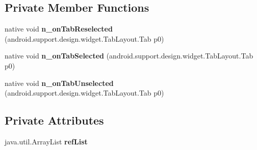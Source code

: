 \subsection*{Private Member Functions}
\begin{DoxyCompactItemize}
\item 
\mbox{\label{classmono_1_1android_1_1support_1_1design_1_1widget_1_1TabLayout__OnTabSelectedListenerImplementor_ac18eb505a0d94b91fdf29e1854630ce3}} 
native void {\bfseries n\+\_\+on\+Tab\+Reselected} (android.\+support.\+design.\+widget.\+Tab\+Layout.\+Tab p0)
\item 
\mbox{\label{classmono_1_1android_1_1support_1_1design_1_1widget_1_1TabLayout__OnTabSelectedListenerImplementor_ab714061ffdc62192ab6c46f25ef81e04}} 
native void {\bfseries n\+\_\+on\+Tab\+Selected} (android.\+support.\+design.\+widget.\+Tab\+Layout.\+Tab p0)
\item 
\mbox{\label{classmono_1_1android_1_1support_1_1design_1_1widget_1_1TabLayout__OnTabSelectedListenerImplementor_a97a237b665a078df5a07f80a61c3b4e5}} 
native void {\bfseries n\+\_\+on\+Tab\+Unselected} (android.\+support.\+design.\+widget.\+Tab\+Layout.\+Tab p0)
\end{DoxyCompactItemize}
\subsection*{Private Attributes}
\begin{DoxyCompactItemize}
\item 
\mbox{\label{classmono_1_1android_1_1support_1_1design_1_1widget_1_1TabLayout__OnTabSelectedListenerImplementor_abc416c9b976f6bc6214e2d2f1c8edac7}} 
java.\+util.\+Array\+List {\bfseries ref\+List}
\end{DoxyCompactItemize}


